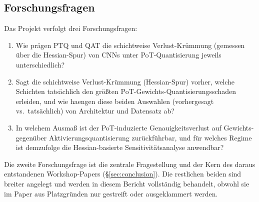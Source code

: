 \subsection{Forschungsfragen}

Das Projekt verfolgt drei Forschungsfragen:

\begin{enumerate}
\item Wie prägen PTQ und QAT die schichtweise Verlust-Krümmung (gemessen über die Hessian-Spur) von CNNs unter PoT-Quantisierung jeweils unterschiedlich?
\item Sagt die schichtweise Verlust-Krümmung (Hessian-Spur) vorher, welche Schichten tatsächlich den größten PoT-Gewichts-Quantisierungsschaden erleiden, und wie haengen diese beiden Auswahlen (vorhergesagt vs.\ tatsächlich) von Architektur und Datensatz ab?
\item In welchem Ausmaß ist der PoT-induzierte Genauigkeitsverlust auf Gewichts- gegenüber Aktivierungsquantisierung zurückführbar, und für welches Regime ist demzufolge die Hessian-basierte Sensitivitätsanalyse anwendbar?
\end{enumerate}

Die zweite Forschungsfrage ist die zentrale Fragestellung und der Kern des daraus entstandenen Workshop-Papers (\S\ref{sec:conclusion}). Die restlichen beiden sind breiter angelegt und werden in diesem Bericht vollständig behandelt, obwohl sie im Paper aus Platzgründen nur gestreift oder ausgeklammert werden.